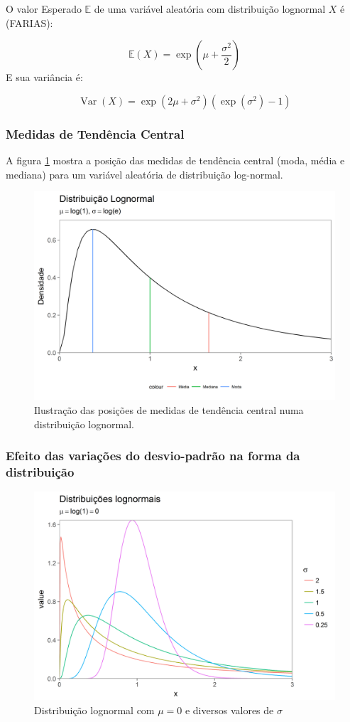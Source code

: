 \documentclass[a4paper]{article}
\begin{document}
O valor Esperado \(\mathbb{E}\) de uma variável aleatória com
distribuição lognormal \(X\) é (FARIAS):

\[\mathbb{E}(X) = \exp \left (\mu + \frac{\sigma^2}{2} \right )\] E sua
variância é:

\[\newcommand{\Var}{\operatorname{Var}} \Var(X) = \exp (2\mu+\sigma^2)(\exp(\sigma^2)-1)\]

\subsubsection{Medidas de Tendência
Central}\label{medidas-de-tendencia-central}

A figura \ref{fig:densidade_medidas} mostra a posição das medidas de
tendência central (moda, média e mediana) para um variável aleatória de
distribuição log-normal.

\begin{figure}[H]

{\centering \includegraphics[width=0.5\linewidth]{images/densidade_medidas-1} 

}

\caption{Ilustração das posições de medidas de tendência central numa distribuição lognormal.}\label{fig:densidade_medidas}
\end{figure}

\subsubsection{Efeito das variações do desvio-padrão na forma da
distribuição}\label{efeito-das-variacoes-do-desvio-padrao-na-forma-da-distribuicao}

\begin{figure}[H]

{\centering \includegraphics[width=0.5\linewidth]{images/logs-1} 

}

\caption{Distribuição lognormal com $\mu = 0$ e diversos valores de $\sigma$}\label{fig:logs}
\end{figure}
\end{document}
